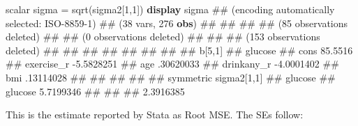 \documentclass[
  letterpaper,
  DIV=11,
  numbers=noendperiod]{scrreprt}
\newenvironment{Shaded}{\begin{snugshade}}{\end{snugshade}}
\newcommand{\FunctionTok}[1]{\textcolor[rgb]{0.28,0.35,0.67}{#1}}
\newcommand{\KeywordTok}[1]{\textcolor[rgb]{0.00,0.23,0.31}{\textbf{#1}}}
\newcommand{\NormalTok}[1]{\textcolor[rgb]{0.00,0.23,0.31}{#1}}
\begin{document}
\begin{Shaded}
\begin{Highlighting}[]
\FunctionTok{scalar}\NormalTok{ sigma = }\FunctionTok{sqrt}\NormalTok{(sigma2[1,1])}
\KeywordTok{display}\NormalTok{ sigma}
\NormalTok{\#\# (encoding automatically selected: ISO{-}8859{-}1)}
\NormalTok{\#\# (38 vars, 276 }\KeywordTok{obs}\NormalTok{)}
\NormalTok{\#\# }
\NormalTok{\#\# }
\NormalTok{\#\# }
\NormalTok{\#\# (85 observations deleted)}
\NormalTok{\#\# }
\NormalTok{\#\# (0 observations deleted)}
\NormalTok{\#\# }
\NormalTok{\#\# }
\NormalTok{\#\# (153 observations deleted)}
\NormalTok{\#\# }
\NormalTok{\#\# }
\NormalTok{\#\# }
\NormalTok{\#\# }
\NormalTok{\#\# }
\NormalTok{\#\# }
\NormalTok{\#\# }
\NormalTok{\#\# b[5,1]}
\NormalTok{\#\#                glucose}
\NormalTok{\#\#       cons     85.5516}
\NormalTok{\#\# exercise\_r  {-}5.5828251}
\NormalTok{\#\#        age   .30620033}
\NormalTok{\#\# drinkany\_r  {-}4.0001402}
\NormalTok{\#\#        bmi   .13114028}
\NormalTok{\#\# }
\NormalTok{\#\# }
\NormalTok{\#\# }
\NormalTok{\#\# }
\NormalTok{\#\# symmetric sigma2[1,1]}
\NormalTok{\#\#            glucose}
\NormalTok{\#\# glucose  5.7199346}
\NormalTok{\#\# }
\NormalTok{\#\# }
\NormalTok{\#\# 2.3916385}
\end{Highlighting}
\end{Shaded}

This is the estimate reported by Stata as Root MSE. The SEs follow:
\end{document}
